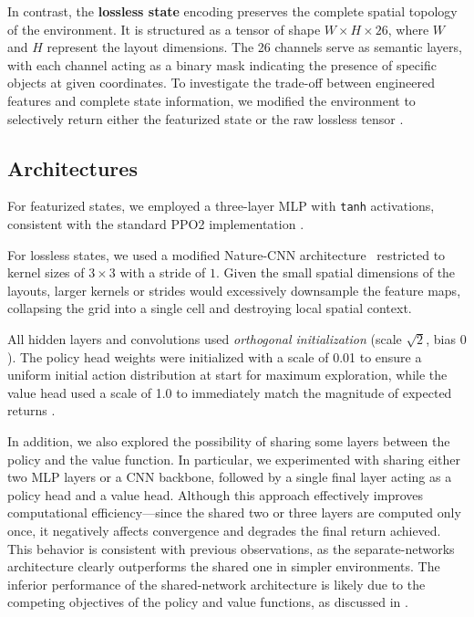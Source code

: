 \documentclass{article}
\begin{document}
In contrast, the \textbf{lossless state} encoding preserves the complete
spatial topology of the environment. It is structured as a tensor of shape
$W\times H\times26$, where $W$ and $H$ represent the layout dimensions. The 26
channels serve as semantic layers, with each channel acting as a binary mask
indicating the presence of specific objects at given coordinates. To
investigate the trade-off between engineered features and complete state
information, we modified the environment to selectively return either the
featurized state or the raw lossless tensor \cite{cai2021overcooked}.

\subsection{Architectures}

For featurized states, we employed a three-layer MLP with \texttt{tanh}
activations, consistent with the standard PPO2 implementation
\cite{huang2022ppo}.

For lossless states, we used a modified Nature-CNN
architecture~\cite{mnih2015humanlevel} restricted to kernel sizes of
$3\times3$ with a stride of $1$. Given the small spatial dimensions of the
layouts, larger kernels or strides would excessively downsample the feature
maps, collapsing the grid into a single cell and destroying local spatial
context.

All hidden layers and convolutions used \textit{orthogonal initialization}
(scale $\sqrt{2}$, bias $0$). The policy head weights were initialized with a
scale of 0.01 to ensure a uniform initial action distribution at start for
maximum exploration, while the value head used a scale of 1.0 to immediately
match the magnitude of expected returns \cite{huang2022ppo}.

In addition, we also explored the possibility of sharing some layers between
the policy and the value function. In particular, we experimented with sharing
either two MLP layers or a CNN backbone, followed by a single final layer
acting as a policy head and a value head. Although this approach effectively
improves computational efficiency—since the shared two or three layers are
computed only once, it negatively affects convergence and degrades the final
return achieved. This behavior is consistent with previous observations, as
the separate-networks architecture clearly outperforms the shared one in
simpler environments. The inferior performance of the shared-network
architecture is likely due to the competing objectives of the policy and value
functions, as discussed in \cite{huang2022ppo}.
\end{document}
